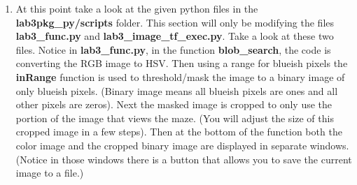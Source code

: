 \begin{enumerate}
\textbf{Side Note:}  What is the H,S,V color space?  Please see the reference link to the Wikipedia  page discussing color spaces.  You are probably most familiar with the R,G,B (red,green,blue) color space.  Here each pixel of an image has a R,G,B value.  With H,S,V colors are placed on a color wheel and you indicate which color you are interested in by selecting an angle range.  In \textbf{OpenCV} the range of the angle is from 0 degrees to 180 degrees.  (You will find other implementations that use 0-360).  For example a blueish color would be in the angle range of 110 degrees to 130 degrees.  The S value is a number between 0 and 255 with 0 being very white and washed out and 255 the full, clear color.  The V value is also a number between 0 and 255 with 0 being very dark and shaded and 255 the full clear color.  The main reason we use the H,S,V color space in this lab is that it makes finding a color with different shading and lighting conditions much easier. 

\item At this point take a look at the given python files in the \textbf{lab3pkg\_py/scripts} folder. This section will only be modifying the files \textbf{lab3\_func.py} and \textbf{lab3\_image\_tf\_exec.py}.  Take a look at these two files.  Notice in \textbf{lab3\_func.py}, in the function \textbf{blob\_search}, the code is converting the RGB image to HSV.  Then using a range for blueish pixels the \textbf{inRange} function is used to threshold/mask the image to a binary image of only blueish pixels. (Binary image means all blueish pixels are ones and all other pixels are zeros).  Next the masked image is cropped to only use the portion of the image that views the maze.  (You will adjust the size of this cropped image in a few steps).  Then at the bottom of the function both the color image and the cropped binary image are displayed in separate windows.  (Notice in those windows there is a button that allows you to save the current image to a file.)
  

\end{enumerate}
